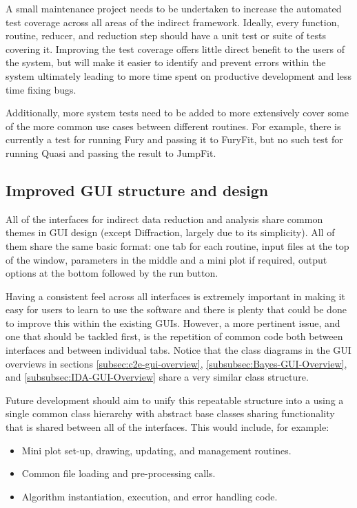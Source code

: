 \documentclass[paper=a4, fontsize=11pt]{scrartcl}	%
\numberwithin{equation}{section}															%
\numberwithin{figure}{section}																%
\numberwithin{table}{section}																%
\begin{document}
A small maintenance project needs to be undertaken to increase the automated test coverage across all areas of the indirect framework. Ideally, every function, routine, reducer, and reduction step should have a unit test or suite of tests covering it. Improving the test coverage offers little direct benefit to the users of the system, but will make it easier to identify and prevent errors within the system ultimately leading to more time spent on productive development and less time fixing bugs.

Additionally, more system tests need to be added to more extensively cover some of the more common use cases between different routines. For example, there is currently a test for running Fury and passing it to FuryFit, but no such test for running Quasi and passing the result to JumpFit.

\subsection{Improved GUI structure and design}
\label{subsec:GUI-Improvements}
All of the interfaces for indirect data reduction and analysis share common themes in GUI design (except Diffraction, largely due to its simplicity). All of them share the same basic format: one tab for each routine, input files at the top of the window, parameters in the middle and a mini plot if required, output options at the bottom followed by the run button.

Having a consistent feel across all interfaces is extremely important in making it easy for users to learn to use the software and there is plenty that could be done to improve this within the existing GUIs. However, a more pertinent issue, and one that should be tackled first, is the repetition of common code both between interfaces and between individual tabs. Notice that the class diagrams in the GUI overviews in sections \ref{subsec:c2e-gui-overview}, \ref{subsubsec:Bayes-GUI-Overview}, and \ref{subsubsec:IDA-GUI-Overview} share a very similar class structure.

Future development should aim to unify this repeatable structure into a using a single common class hierarchy with abstract base classes sharing functionality that is shared between all of the interfaces. This would include, for example:

\begin{itemize}
\item Mini plot set-up, drawing, updating, and management routines.
\item Common file loading and pre-processing calls.
\item Algorithm instantiation, execution, and error handling code.
\end{itemize}
\end{document}
